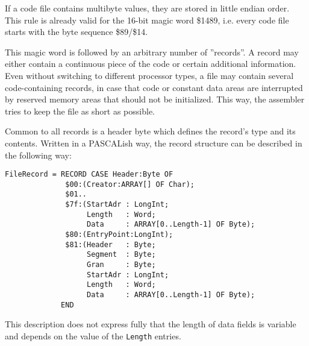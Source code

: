 \documentclass[12pt,twoside]{report}
\newcommand{\tty}[1]{{\tt #1}}
\begin{document}
If a code file contains multibyte values, they are stored in little
endian order.  This rule is already valid for the 16-bit magic word
\$1489, i.e. every code file starts with the byte sequence \$89/\$14.

This magic word is followed by an arbitrary number of ''records''.  A
record may either contain a continuous piece of the code or certain
additional information.  Even without switching to different
processor types, a file may contain several code-containing records,
in case that code or constant data areas are interrupted by reserved
memory areas that should not be initialized.  This way, the assembler
tries to keep the file as short as possible.

Common to all records is a header byte which defines the record's type
and its contents.  Written in a PASCALish way, the record structure
can be described in the following way:
\begin{verbatim}
FileRecord = RECORD CASE Header:Byte OF
              $00:(Creator:ARRAY[] OF Char);
              $01..
              $7f:(StartAdr : LongInt;
                   Length   : Word;
                   Data     : ARRAY[0..Length-1] OF Byte);
              $80:(EntryPoint:LongInt);
              $81:(Header   : Byte;
                   Segment  : Byte;
                   Gran     : Byte;
                   StartAdr : LongInt;
                   Length   : Word;
                   Data     : ARRAY[0..Length-1] OF Byte);
             END
\end{verbatim}
This description does not express fully that the length of data
fields is variable and depends on the value of the \tty{Length} entries.
\end{document}
